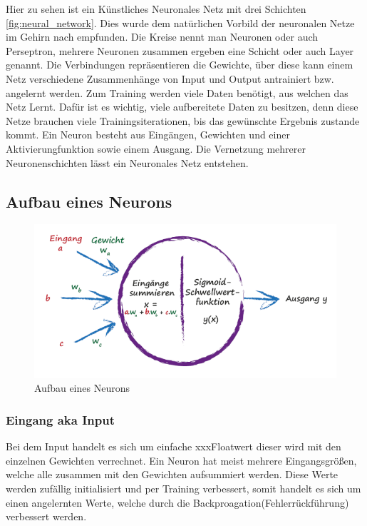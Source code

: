 Hier zu sehen ist ein Künstliches Neuronales Netz mit drei Schichten \ref{fig:neural_network}. Dies wurde dem natürlichen Vorbild der neuronalen Netze im Gehirn nach empfunden. Die Kreise nennt man Neuronen oder auch Perseptron, mehrere Neuronen zusammen ergeben eine Schicht oder auch Layer genannt. Die Verbindungen repräsentieren die Gewichte, über diese kann einem Netz verschiedene Zusammenhänge von Input und Output antrainiert bzw. angelernt werden. Zum Training werden viele Daten benötigt, aus welchen das Netz \glqq Lernt\grqq{}. Dafür ist es wichtig, viele aufbereitete Daten zu besitzen, denn diese Netze brauchen viele Trainingsiterationen, bis das gewünschte Ergebnis zustande kommt. Ein Neuron besteht aus Eingängen, Gewichten und einer Aktivierungfunktion sowie einem Ausgang. Die Vernetzung mehrerer Neuronenschichten lässt ein Neuronales Netz entstehen.

\newpage



\subsection{Aufbau eines Neurons}
\begin{figure}[htb]
  \centering  
  \includegraphics[scale=0.5]{img/S41_Buildyourown.png}
  \caption{Aufbau eines Neurons \cite{Rashid2017}}
  \label{fig:neuron}
  

\end{figure}
\subsubsection{Eingang aka Input}
Bei dem Input handelt es sich um einfache xxxFloatwert dieser wird mit den einzelnen Gewichten verrechnet. Ein Neuron hat meist mehrere Eingangsgrößen, welche alle zusammen mit den Gewichten aufsummiert werden. Diese Werte werden zufällig initialisiert und per Training verbessert, somit handelt es sich um einen angelernten Werte, welche durch die Backproagation(Fehlerrückführung) verbessert werden.

